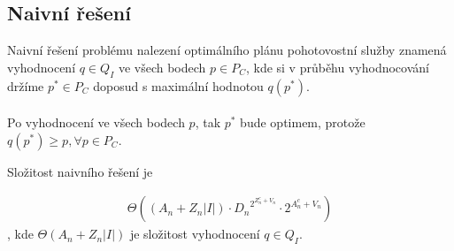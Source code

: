 \subsection{Naivní řešení}\label{kap:naivniRes}

\begin{definice}\label{df:naivniRes}
  Naivní řešení problému nalezení optimálního plánu pohotovostní služby znamená vyhodnocení $q \in Q_I$ ve všech bodech $p \in P_C$,
  kde si v průběhu vyhodnocování držíme $p^* \in P_C$ doposud s maximální hodnotou $q(p^*)$.
  \\
  \\
  Po vyhodnocení ve všech bodech $p$, tak $p^*$ bude optimem, protože $q(p^*) \geq p, \forall p \in P_C$.
\end{definice}

\begin{veta}\label{veta:slozitostNaivRes}
  Složitost naivního řešení je

  \begin{align*}
    \Theta((A_n + Z_n |I|) \cdot {D_n}^{2^{Z^c_n + V_n}} \cdot 2^{A^c_n + V_n})
  \end{align*}
  , kde $\Theta (A_n + Z_n |I|)$ je složitost vyhodnocení $q \in Q_I$.
  \\
\end{veta}
